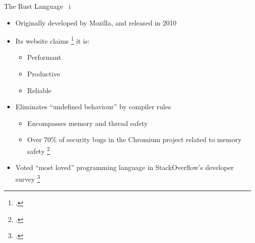 \documentclass[10pt,aspectratio=169]{beamer}
\begin{document}
\begin{frame}{The Rust Language \ i}
    \begin{itemize}
        \item Originally developed by Mozilla, and released in 2010
        \item Its website claims \footcite{RustProgrammingLanguage} it is:
        \begin{itemize}
            \item Performant
            \item Productive
            \item Reliable
        \end{itemize}
        \vspace*{0.25cm}
        \item Eliminates ``undefined behaviour'' by compiler rules
        \begin{itemize}
            \item Encompasses memory and thread safety
            \item Over 70\% of security bugs in the Chromium project related to memory safety \footcite{MemorySafety}
        \end{itemize}
        \vspace*{0.25cm}
        \item Voted ``most loved'' programming language in StackOverflow's developer survey \footcite{StackOverflowDeveloper}
        \vspace*{0.25cm}
    \end{itemize}
\end{frame}
\end{document}
